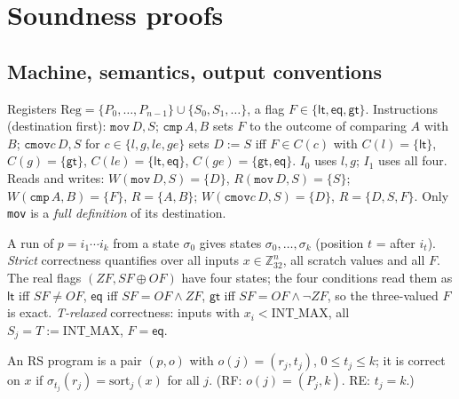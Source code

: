 \newcommand{\lt}{\mathsf{lt}}\newcommand{\eqf}{\mathsf{eq}}\newcommand{\gt}{\mathsf{gt}}
\newcommand{\Wn}{\mathcal{W}_n}\newcommand{\srt}{\mathrm{sort}}
\newcommand{\RS}{\ensuremath{\mathrm{RS}}}\newcommand{\MM}{\ensuremath{\mathrm{MM}}}

\section{Soundness proofs}\label{app:proofs}

\subsection{Machine, semantics, output conventions}
Registers $\mathrm{Reg}=\{P_0,\dots,P_{n-1}\}\cup\{S_0,S_1,\dots\}$, a flag $F\in\{\lt,\eqf,\gt\}$.
Instructions (destination first): $\texttt{mov}\,D,S$; $\texttt{cmp}\,A,B$ sets $F$ to the outcome of comparing $A$ with $B$;
$\texttt{cmov}c\,D,S$ for $c\in\{l,g,le,ge\}$ sets $D:=S$ iff $F\in C(c)$ with
$C(l)=\{\lt\}$, $C(g)=\{\gt\}$, $C(le)=\{\lt,\eqf\}$, $C(ge)=\{\gt,\eqf\}$. $I_0$ uses $l,g$; $I_1$ uses all four.
Reads and writes: $W(\texttt{mov}\,D,S)=\{D\}$, $R(\texttt{mov}\,D,S)=\{S\}$; $W(\texttt{cmp}\,A,B)=\{F\}$, $R=\{A,B\}$;
$W(\texttt{cmov}c\,D,S)=\{D\}$, $R=\{D,S,F\}$. Only \texttt{mov} is a \emph{full definition} of its destination.

A run of $p=i_1\cdots i_k$ from a state $\sigma_0$ gives states $\sigma_0,\dots,\sigma_k$ (position $t$ = after $i_t$).
\emph{Strict} correctness quantifies over all inputs $x\in\mathbb{Z}_{32}^n$, all scratch values and all $F$.
The real flags $(ZF, SF\oplus OF)$ have four states; the four conditions read them as
$\lt$ iff $SF\neq OF$, $\eqf$ iff $SF=OF\wedge ZF$, $\gt$ iff $SF=OF\wedge\neg ZF$, so the three-valued $F$ is exact.
\emph{T-relaxed} correctness: inputs with $x_i<\mathrm{INT\_MAX}$, all $S_j=T:=\mathrm{INT\_MAX}$, $F=\eqf$.

An \RS{} program is a pair $(p,o)$ with $o(j)=(r_j,t_j)$, $0\le t_j\le k$; it is correct on $x$ if
$\sigma_{t_j}(r_j)=\srt_j(x)$ for all $j$. (RF: $o(j)=(P_j,k)$. RE: $t_j=k$.)

